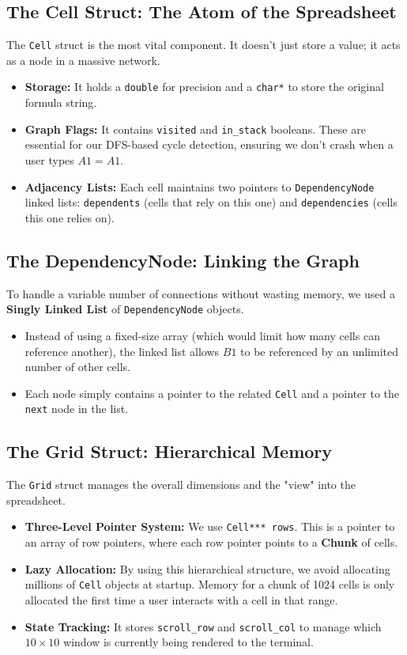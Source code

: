 \documentclass[twocolumn]{article}
\begin{document}
\subsection{The Cell Struct: The Atom of the Spreadsheet}
The \texttt{Cell} struct is the most vital component. It doesn't just store a value; it acts as a node in a massive network.
\begin{itemize}
    \item \textbf{Storage:} It holds a \texttt{double} for precision and a \texttt{char*} to store the original formula string.
    \item \textbf{Graph Flags:} It contains \texttt{visited} and \texttt{in\_stack} booleans. These are essential for our DFS-based cycle detection, ensuring we don't crash when a user types $A1=A1$.
    \item \textbf{Adjacency Lists:} Each cell maintains two pointers to \texttt{DependencyNode} linked lists: \texttt{dependents} (cells that rely on this one) and \texttt{dependencies} (cells this one relies on).
\end{itemize}

\subsection{The DependencyNode: Linking the Graph}
To handle a variable number of connections without wasting memory, we used a \textbf{Singly Linked List} of \texttt{DependencyNode} objects.
\begin{itemize}
    \item Instead of using a fixed-size array (which would limit how many cells can reference another), the linked list allows $B1$ to be referenced by an unlimited number of other cells. 
    \item Each node simply contains a pointer to the related \texttt{Cell} and a pointer to the \texttt{next} node in the list.
\end{itemize}

\subsection{The Grid Struct: Hierarchical Memory}
The \texttt{Grid} struct manages the overall dimensions and the "view" into the spreadsheet.
\begin{itemize}
    \item \textbf{Three-Level Pointer System:} We use \texttt{Cell*** rows}. This is a pointer to an array of row pointers, where each row pointer points to a \textbf{Chunk} of cells. 
    \item \textbf{Lazy Allocation:} By using this hierarchical structure, we avoid allocating millions of \texttt{Cell} objects at startup. Memory for a chunk of 1024 cells is only allocated the first time a user interacts with a cell in that range.
    \item \textbf{State Tracking:} It stores \texttt{scroll\_row} and \texttt{scroll\_col} to manage which $10 \times 10$ window is currently being rendered to the terminal.
\end{itemize}
\end{document}
